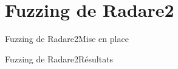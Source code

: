 \section{Fuzzing de Radare2}

\begin{frame}{Fuzzing de Radare2}{Mise en place}
\end{frame}

\begin{frame}{Fuzzing de Radare2}{Résultats}
\end{frame}

